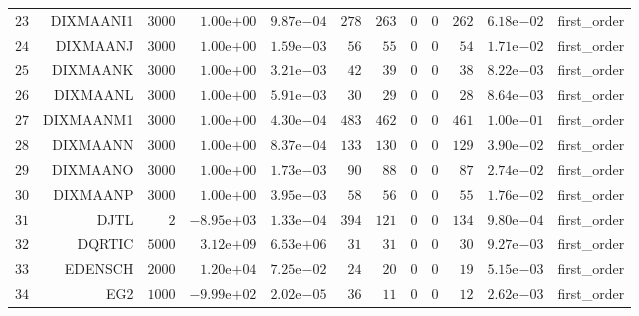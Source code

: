\begin{longtable}{rrrrrrrrrrrr}
  \(    23\) & DIXMAANI1 & \(  3000\) & \( 1.00\)e\(+00\) & \( 9.87\)e\(-04\) & \(   278\) & \(   263\) & \(     0\) & \(     0\) & \(   262\) & \( 6.18\)e\(-02\) & first\_order \\
  \(    24\) & DIXMAANJ & \(  3000\) & \( 1.00\)e\(+00\) & \( 1.59\)e\(-03\) & \(    56\) & \(    55\) & \(     0\) & \(     0\) & \(    54\) & \( 1.71\)e\(-02\) & first\_order \\
  \(    25\) & DIXMAANK & \(  3000\) & \( 1.00\)e\(+00\) & \( 3.21\)e\(-03\) & \(    42\) & \(    39\) & \(     0\) & \(     0\) & \(    38\) & \( 8.22\)e\(-03\) & first\_order \\
  \(    26\) & DIXMAANL & \(  3000\) & \( 1.00\)e\(+00\) & \( 5.91\)e\(-03\) & \(    30\) & \(    29\) & \(     0\) & \(     0\) & \(    28\) & \( 8.64\)e\(-03\) & first\_order \\
  \(    27\) & DIXMAANM1 & \(  3000\) & \( 1.00\)e\(+00\) & \( 4.30\)e\(-04\) & \(   483\) & \(   462\) & \(     0\) & \(     0\) & \(   461\) & \( 1.00\)e\(-01\) & first\_order \\
  \(    28\) & DIXMAANN & \(  3000\) & \( 1.00\)e\(+00\) & \( 8.37\)e\(-04\) & \(   133\) & \(   130\) & \(     0\) & \(     0\) & \(   129\) & \( 3.90\)e\(-02\) & first\_order \\
  \(    29\) & DIXMAANO & \(  3000\) & \( 1.00\)e\(+00\) & \( 1.73\)e\(-03\) & \(    90\) & \(    88\) & \(     0\) & \(     0\) & \(    87\) & \( 2.74\)e\(-02\) & first\_order \\
  \(    30\) & DIXMAANP & \(  3000\) & \( 1.00\)e\(+00\) & \( 3.95\)e\(-03\) & \(    58\) & \(    56\) & \(     0\) & \(     0\) & \(    55\) & \( 1.76\)e\(-02\) & first\_order \\
  \(    31\) & DJTL & \(     2\) & \(-8.95\)e\(+03\) & \( 1.33\)e\(-04\) & \(   394\) & \(   121\) & \(     0\) & \(     0\) & \(   134\) & \( 9.80\)e\(-04\) & first\_order \\
  \(    32\) & DQRTIC & \(  5000\) & \( 3.12\)e\(+09\) & \( 6.53\)e\(+06\) & \(    31\) & \(    31\) & \(     0\) & \(     0\) & \(    30\) & \( 9.27\)e\(-03\) & first\_order \\
  \(    33\) & EDENSCH & \(  2000\) & \( 1.20\)e\(+04\) & \( 7.25\)e\(-02\) & \(    24\) & \(    20\) & \(     0\) & \(     0\) & \(    19\) & \( 5.15\)e\(-03\) & first\_order \\
  \(    34\) & EG2 & \(  1000\) & \(-9.99\)e\(+02\) & \( 2.02\)e\(-05\) & \(    36\) & \(    11\) & \(     0\) & \(     0\) & \(    12\) & \( 2.62\)e\(-03\) & first\_order \\

\end{longtable}
